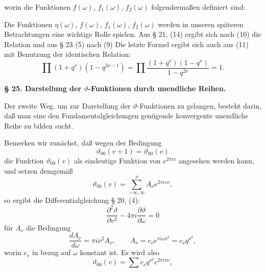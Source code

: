 
worin die Funktionen $f(\omega)$, $f_1(\omega)$, $f_2(\omega)$
folgendermaßen definiert sind:

Die Funktionen $\eta(\omega)$, $f(\omega)$, $f_1(\omega)$,
$f_2(\omega)$ werden in unseren späteren Betrachtungen eine
wichtige Rolle spielen. Aus § 21, (14) ergibt sich nach (10)
die Relation
und aus § 23 (5) nach (9)
Die letzte Formel ergibt sich auch aus (11) mit Benutzung der
identischen Relation:
\[ \prod (1+q^\nu)(1-q^{2\nu-1}) = \prod \frac{(1+q^\nu)(1-q^\nu)}{1-q^{2\nu}} = 1. \]

\begin{center}
\textbf{§ 25. Darstellung der $\vartheta$-Funktionen durch
unendliche Reihen.}
\end{center}

Der zweite Weg, um zur Darstellung der $\vartheta$-Funktionen zu
gelangen, besteht darin, daß man eine den Fundamentalgleichungen
genügende konvergente unendliche Reihe zu bilden sucht.

Bemerken wir zunächst, daß wegen der Bedingung
\[ \vartheta_{00}(v+1) = \vartheta_{00}(v) \]
die Funktion $\vartheta_{00}(v)$ als eindeutige Funktion von
$e^{2\pi i v}$ angesehen werden kann, und setzen demgemäß
\[ \vartheta_{00}(v) = \sum_{-\infty,\infty}^{\nu} A_\nu e^{2\pi i v \nu}, \]
so ergibt die Differentialgleichung § 20, (4):
\[ \frac{\partial^2 \vartheta}{\partial v^2} - 4\pi i \frac{\partial \vartheta}{\partial \omega} = 0 \]
für $A_\nu$ die Bedingung
\[ \frac{dA_\nu}{d\omega} = \pi i \nu^2 A_\nu, \qquad A_\nu = c_\nu e^{\pi i \omega \nu^2} = c_\nu q^{\nu^2}, \]
worin $c_\nu$ in bezug auf $\omega$ konstant ist. Es wird also
\[ \vartheta_{00}(v) = \sum c_\nu q^{\nu^2} c^{2\pi i v \nu}, \]
